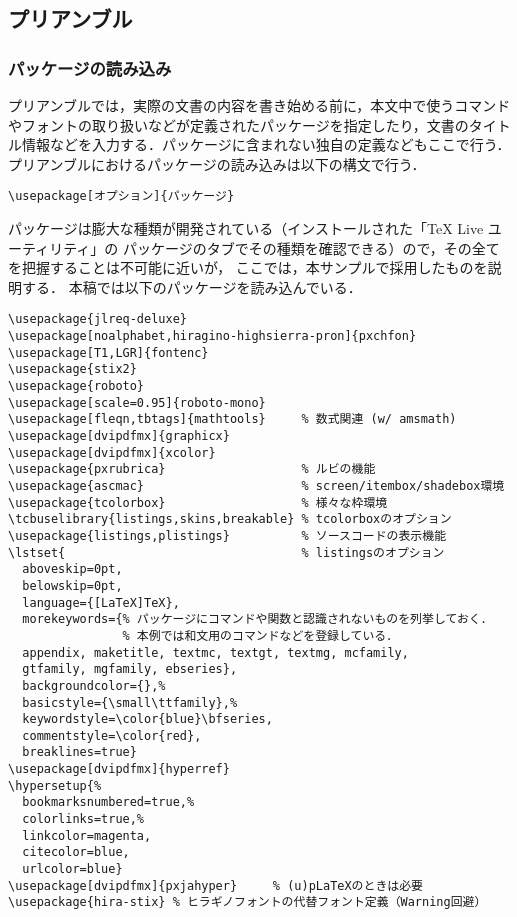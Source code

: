 \subsection{プリアンブル}

\subsubsection{パッケージの読み込み}

プリアンブルでは，実際の文書の内容を書き始める前に，本文中で使うコマンドやフォントの取り扱いなどが定義されたパッケージを指定したり，文書のタイトル情報などを入力する．パッケージに含まれない独自の定義などもここで行う．
プリアンブルにおけるパッケージの読み込みは以下の構文で行う．
\begin{tcolorbox}[colback=blue!5!white,colframe=blue!70!black]
\begin{lstlisting}
\usepackage[オプション]{パッケージ}
\end{lstlisting}
\end{tcolorbox}

パッケージは膨大な種類が開発されている（インストールされた「TeX Live ユーティリティ」の
パッケージのタブでその種類を確認できる）ので，その全てを把握することは不可能に近いが，
ここでは，本サンプルで採用したものを説明する．
本稿では以下のパッケージを読み込んでいる．
\begin{tcolorbox}[title=\gtbf{本稿で採用したパッケージ},colback=blue!5!white,colframe=blue!75!black,enhanced,breakable=true]
\begin{lstlisting}
\usepackage{jlreq-deluxe}
\usepackage[noalphabet,hiragino-highsierra-pron]{pxchfon}
\usepackage[T1,LGR]{fontenc}
\usepackage{stix2}
\usepackage{roboto}
\usepackage[scale=0.95]{roboto-mono}
\usepackage[fleqn,tbtags]{mathtools}     % 数式関連 (w/ amsmath)
\usepackage[dvipdfmx]{graphicx}
\usepackage[dvipdfmx]{xcolor}
\usepackage{pxrubrica}                   % ルビの機能
\usepackage{ascmac}                      % screen/itembox/shadebox環境
\usepackage{tcolorbox}                   % 様々な枠環境
\tcbuselibrary{listings,skins,breakable} % tcolorboxのオプション
\usepackage{listings,plistings}          % ソースコードの表示機能
\lstset{                                 % listingsのオプション
  aboveskip=0pt,
  belowskip=0pt,
  language={[LaTeX]TeX}, 
  morekeywords={% パッケージにコマンドや関数と認識されないものを列挙しておく．
                % 本例では和文用のコマンドなどを登録している．
  appendix, maketitle, textmc, textgt, textmg, mcfamily,
  gtfamily, mgfamily, ebseries},
  backgroundcolor={},% 
  basicstyle={\small\ttfamily},% 
  keywordstyle=\color{blue}\bfseries,
  commentstyle=\color{red},
  breaklines=true} 
\usepackage[dvipdfmx]{hyperref}
\hypersetup{%
  bookmarksnumbered=true,%
  colorlinks=true,%
  linkcolor=magenta,
  citecolor=blue,
  urlcolor=blue}
\usepackage[dvipdfmx]{pxjahyper}     % (u)pLaTeXのときは必要
\usepackage{hira-stix} % ヒラギノフォントの代替フォント定義（Warning回避）
\end{lstlisting}
\end{tcolorbox}

